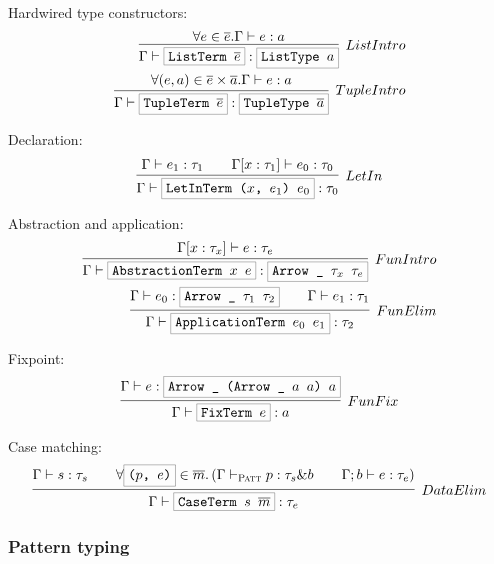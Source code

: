 \documentclass[a4paper]{scrartcl}
\newcommand{\hsterm}[1]{%
    \setlength{\fboxsep}{3pt}%
    \setlength{\fboxrule}{0.2pt}%
    \fbox{\texttt{#1}}}
\renewcommand{\vec}[1]{\overline{#1}}
\begin{document}
Hardwired type constructors:
\begin{align*}
\infer[ListIntro]%
    {\Gamma \vdash \hsterm{ListTerm \ensuremath{\vec{e}}} : \hsterm{ListType \ensuremath{a}}}%
    {\forall e \in \vec{e}. \Gamma \vdash e : a}\\
\infer[TupleIntro]%
    {\Gamma \vdash \hsterm{TupleTerm \ensuremath{\vec{e}}} : \hsterm{TupleType \ensuremath{\vec{a}}}}%
    {\forall (e,a) \in \vec{e}\times\vec{a}. \Gamma \vdash e : a}
\end{align*}

Declaration:
\begin{align*}
\infer[LetIn]%
    {\Gamma \vdash \hsterm{LetInTerm (\ensuremath{x}, \ensuremath{e_1}) \ensuremath{e_0}} : \tau_0}%
    {\Gamma \vdash e_1 : \tau_1 \qquad \Gamma [x : \tau_1] \vdash e_0 : \tau_0}
\end{align*}

Abstraction and application:
\begin{align*}
\infer[FunIntro]%
    {\Gamma \vdash \hsterm{AbstractionTerm \ensuremath{x} \ensuremath{e}} : \hsterm{Arrow \_ \ensuremath{\tau_x} \ensuremath{\tau_e}}}%
    {\Gamma [x : \tau_x] \vdash e : \tau_e}\\
\infer[FunElim]%
    {\Gamma \vdash \hsterm{ApplicationTerm \ensuremath{e_0} \ensuremath{e_1}} : \tau_2}%
    {\Gamma \vdash e_0 : \hsterm{Arrow \_ \ensuremath{\tau_1} \ensuremath{\tau_2}} \qquad \Gamma \vdash e_1 : \tau_1}
\end{align*}

Fixpoint:
\begin{align*}
\infer[FunFix]%
    {\Gamma \vdash \hsterm{FixTerm \ensuremath{e}} : \ensuremath{a}}%
    {\Gamma \vdash \ensuremath{e} : \hsterm{Arrow \_ (Arrow \_ \ensuremath{a} \ensuremath{a}) \ensuremath{a}}}
\end{align*}

Case matching:
\begin{align*}
\infer[DataElim]%
    {\Gamma \vdash \hsterm{CaseTerm \ensuremath{s} \ensuremath{\vec{m}}} : \tau_e}%
    {\Gamma \vdash s : \tau_s \qquad
    \forall \hsterm{(\ensuremath{p}, \ensuremath{e})} \in \vec{m}.\left(
        \Gamma \vdash_\textsc{Patt} p : \tau_s \& b \qquad
        \Gamma; b \vdash e : \tau_e
    \right)}
\end{align*}

\subsubsection{Pattern typing}
\end{document}
